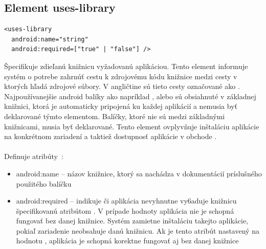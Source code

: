 \subsection{Element uses-library}
\lstset{language=XML}
\begin{lstlisting}
<uses-library
  android:name="string"
  android:required=["true" | "false"] />
\end{lstlisting}
Špecifikuje zdieľanú knižnicu vyžadovanú aplikáciou. Tento element informuje systém o potrebe zahrnúť cestu k zdrojovému kódu knižnice medzi cesty v ktorých  hľadá zdrojové súbory. V angličtine sú tieto cesty označované ako . Najpoužívanejšie android balíky ako napríklad ,  alebo  sú obsiahnuté v základnej knižnici, ktorá je automaticky pripojená ku každej aplikácií a nemusia byť deklarované týmto elementom. Balíčky, ktoré nie sú medzi základnými knižnicami, musia byť deklarované.  Tento element ovplyvňuje inštaláciu aplikácie na konkrétnom zariadení a taktiež dostupnosť aplikácie v obchode .\\\\ Definuje atribúty~\cite{elUsesLib}:\\
\begin{itemize}
\item android:name – názov knižnice, ktorý sa nachádza v dokumentácií príslušného použitého balíčku
\item android:required – indikuje či aplikácia nevyhnutne vy6aduje knižnicu špecifikovanú atribútom . V prípade hodnoty  aplikácia nie je schopná fungovať bez danej knižnice. Systém zamietne inštaláciu takejto aplikácie, pokiaľ zariadenie neobsahuje danú knižnicu. Ak je tento atribút nastavený na hodnotu , aplikácia je schopná korektne fungovať aj bez danej knižnice
\end{itemize}